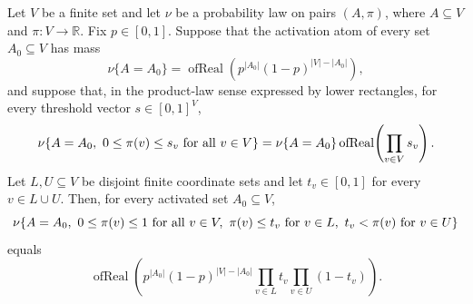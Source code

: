 \begin{helper}
Let \(V\) be a finite set and let \(\nu\) be a probability law on pairs
\((A,\pi)\), where \(A\subseteq V\) and \(\pi:V\to\mathbb R\).  Fix
\(p\in[0,1]\).  Suppose that the activation atom of every set \(A_0\subseteq V\)
has mass
\[
\nu\{A=A_0\}=
\operatorname{ofReal}\!\left(p^{|A_0|}(1-p)^{|V|-|A_0|}\right),
\]
and suppose that, in the product-law sense expressed by lower rectangles, for
every threshold vector \(s\in[0,1]^V\),
\[
\nu\{A=A_0,\ 0\le \pi(v)\le s_v\hbox{ for all }v\in V\}
=
\nu\{A=A_0\}\operatorname{ofReal}\!\left(\prod_{v\in V}s_v\right).
\]
Let \(L,U\subseteq V\) be disjoint finite coordinate sets and let
\(t_v\in[0,1]\) for every \(v\in L\cup U\).  Then, for every activated set
\(A_0\subseteq V\),
\[
\nu\{A=A_0,\ 0\le \pi(v)\le1\hbox{ for all }v\in V,\ 
      \pi(v)\le t_v\hbox{ for }v\in L,\ 
      t_v<\pi(v)\hbox{ for }v\in U\}
\]
equals
\[
\operatorname{ofReal}\!\left(
p^{|A_0|}(1-p)^{|V|-|A_0|}
\prod_{v\in L}t_v
\prod_{v\in U}(1-t_v)\right).
\]
\end{helper}
